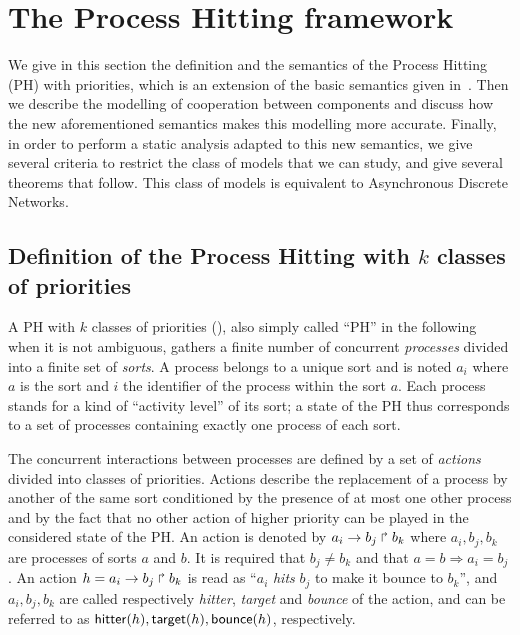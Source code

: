 \section{The Process Hitting framework}

We give in this section the definition and the semantics of the Process Hitting (PH) with priorities, which is an extension of the basic semantics given in~\cite{PMR10-TCSB}.
Then we describe the modelling of cooperation between components and discuss how the new aforementioned semantics makes this modelling more accurate.
Finally, in order to perform a static analysis adapted to this new semantics, we give several criteria to restrict the class of models that we can study,
and give several theorems that follow.
This class of models is equivalent to Asynchronous Discrete Networks.

\subsection{Definition of the Process Hitting with $k$ classes of priorities}
\label{ssec:PH}
A PH with $k$ classes of priorities (), also simply called “PH” in the following when it is not ambiguous, gathers a finite number of concurrent \emph{processes} divided into a finite set of \emph{sorts}.
A process belongs to a unique sort and is noted $a_i$ where $a$ is the sort and $i$ the identifier of the process within the sort $a$.
Each process stands for a kind of “activity level” of its sort; a state of the PH thus corresponds to a set of processes containing exactly one process of each sort.

The concurrent interactions between processes are defined by a set of \emph{actions} divided into classes of priorities.
Actions describe the replacement of a process by another of the same sort conditioned by the presence of at most one other process and by the fact that no other action of higher priority can be played in the considered state of the PH.
An action is denoted by $a_i\rightarrow b_j\Rsh b_k$ where $a_i,b_j,b_k$ are processes of sorts $a$ and $b$.
It is required that $b_j \neq b_k$ and that $a=b\Rightarrow a_i=b_j$.
An action $h=a_i\rightarrow b_j\Rsh b_k$ is read as ``$a_i$ \emph{hits} $b_j$ to make it bounce to $b_k$'', and $a_i,b_j,b_k$ are called respectively \emph{hitter}, \emph{target} and \emph{bounce} of the action, and can be referred to as $\mathsf{hitter}(h), \mathsf{target}(h), \mathsf{bounce}(h)$, respectively.

